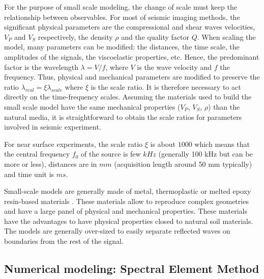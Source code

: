 \documentclass[manuscript,revised]{geophysics}
\begin{document}
\noindent For the purpose of small scale modeling, the change of scale must keep the relationship between observables. For most of seismic imaging methods, the significant physical parameters are the compressional and shear waves velocities, $V_{P}$ and $V_{S}$ respectively, the density $\rho$ and the quality factor $Q$. When scaling the model, many parameters can be modified: the distances, the time scale, the amplitudes of the signals, the viscoelastic properties, etc. Hence, the predominant factor is the wavelength $\lambda = V / f$, where $V$ is the wave velocity and $f$ the frequency. Thus, physical and mechanical parameters are modified to preserve the ratio $\lambda_{real} = \xi \lambda_{scale}$ where $\xi$ is the scale ratio. It is therefore necessary to act directly on the time-frequency scales. Assuming the materials used to build the small scale model have the same mechanical properties ($V_{P}$, $V_{S}$, $\rho$) than the natural media, it is straightforward to obtain the scale ratios for parameters involved in seismic experiment.

\noindent For near surface experiments, the scale ratio $\xi$ is about $1000$ which means that the central frequency $f_{0}$ of the source is few $kHz$ (generally 100 kHz but can be more or less), distances are in $mm$ (acquisition length around 50 mm typically) and time unit is $ms$.

\noindent Small-scale models are generally made of metal, thermoplastic or melted epoxy resin-based materials \citep{Bretaudeau_FWI_2013,Bretaudeau_SSM_2011,Bretaudeau_SSA_2008b}. These materials allow to reproduce complex geometries and have a large panel of physical and mechanical properties. These materials have the advantages to have physical properties closed to natural soil materials. The models are generally over-sized to easily separate reflected waves on boundaries from the rest of the signal. 

\subsection{Numerical modeling: Spectral Element Method}
\end{document}

